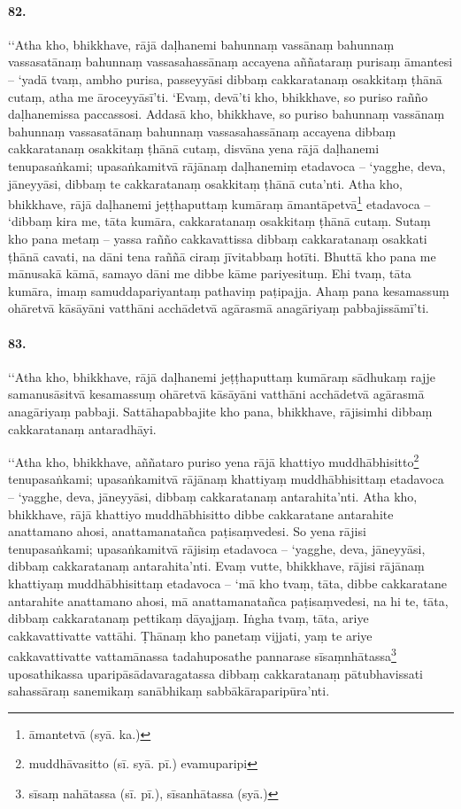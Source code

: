 \paragraph{82.} ‘‘Atha kho, bhikkhave, rājā daḷhanemi bahunnaṃ vassānaṃ bahunnaṃ vassasatānaṃ bahunnaṃ vassasahassānaṃ accayena aññataraṃ purisaṃ āmantesi – ‘yadā tvaṃ, ambho purisa, passeyyāsi dibbaṃ cakkaratanaṃ osakkitaṃ ṭhānā cutaṃ, atha me āroceyyāsī’ti. ‘Evaṃ, devā’ti kho, bhikkhave, so puriso rañño daḷhanemissa paccassosi. Addasā kho, bhikkhave, so puriso bahunnaṃ vassānaṃ bahunnaṃ vassasatānaṃ bahunnaṃ vassasahassānaṃ accayena dibbaṃ cakkaratanaṃ osakkitaṃ ṭhānā cutaṃ, disvāna yena rājā daḷhanemi tenupasaṅkami; upasaṅkamitvā rājānaṃ daḷhanemiṃ etadavoca – ‘yagghe, deva, jāneyyāsi, dibbaṃ te cakkaratanaṃ osakkitaṃ ṭhānā cuta’nti. Atha kho, bhikkhave, rājā daḷhanemi jeṭṭhaputtaṃ kumāraṃ āmantāpetvā\footnote{āmantetvā (syā. ka.)} etadavoca – ‘dibbaṃ kira me, tāta kumāra, cakkaratanaṃ osakkitaṃ ṭhānā cutaṃ. Sutaṃ kho pana metaṃ – yassa rañño cakkavattissa dibbaṃ cakkaratanaṃ osakkati ṭhānā cavati, na dāni tena raññā ciraṃ jīvitabbaṃ hotīti. Bhuttā kho pana me mānusakā kāmā, samayo dāni me dibbe kāme pariyesituṃ. Ehi tvaṃ, tāta kumāra, imaṃ samuddapariyantaṃ pathaviṃ paṭipajja. Ahaṃ pana kesamassuṃ ohāretvā kāsāyāni vatthāni acchādetvā agārasmā anagāriyaṃ pabbajissāmī’ti.

\paragraph{83.} ‘‘Atha kho, bhikkhave, rājā daḷhanemi jeṭṭhaputtaṃ kumāraṃ sādhukaṃ rajje samanusāsitvā kesamassuṃ ohāretvā kāsāyāni vatthāni acchādetvā agārasmā anagāriyaṃ pabbaji. Sattāhapabbajite kho pana, bhikkhave, rājisimhi dibbaṃ cakkaratanaṃ antaradhāyi.

‘‘Atha kho, bhikkhave, aññataro puriso yena rājā khattiyo muddhābhisitto\footnote{muddhāvasitto (sī. syā. pī.) evamuparipi} tenupasaṅkami; upasaṅkamitvā rājānaṃ khattiyaṃ muddhābhisittaṃ etadavoca – ‘yagghe, deva, jāneyyāsi, dibbaṃ cakkaratanaṃ antarahita’nti. Atha kho, bhikkhave, rājā khattiyo muddhābhisitto dibbe cakkaratane antarahite anattamano ahosi, anattamanatañca paṭisaṃvedesi. So yena rājisi tenupasaṅkami; upasaṅkamitvā rājisiṃ etadavoca – ‘yagghe, deva, jāneyyāsi, dibbaṃ cakkaratanaṃ antarahita’nti. Evaṃ vutte, bhikkhave, rājisi rājānaṃ khattiyaṃ muddhābhisittaṃ etadavoca – ‘mā kho tvaṃ, tāta, dibbe cakkaratane antarahite anattamano ahosi, mā anattamanatañca paṭisaṃvedesi, na hi te, tāta, dibbaṃ cakkaratanaṃ pettikaṃ dāyajjaṃ. Iṅgha tvaṃ, tāta, ariye cakkavattivatte vattāhi. Ṭhānaṃ kho panetaṃ vijjati, yaṃ te ariye cakkavattivatte vattamānassa tadahuposathe pannarase sīsaṃnhātassa\footnote{sīsaṃ nahātassa (sī. pī.), sīsanhātassa (syā.)} uposathikassa uparipāsādavaragatassa dibbaṃ cakkaratanaṃ pātubhavissati sahassāraṃ sanemikaṃ sanābhikaṃ sabbākāraparipūra’nti.

